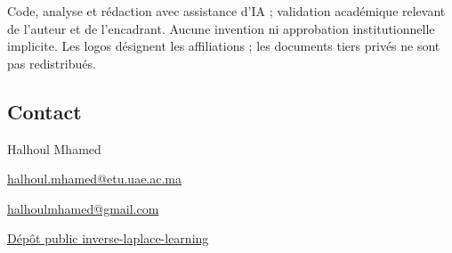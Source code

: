 \documentclass[11pt,a4paper]{article}
\begin{document}
Code, analyse et rédaction avec assistance d'IA ; validation académique relevant de l'auteur et de l'encadrant. Aucune invention ni approbation institutionnelle implicite. Les logos désignent les affiliations ; les documents tiers privés ne sont pas redistribués.

\subsection*{Contact}
Halhoul Mhamed\par
\href{mailto:halhoul.mhamed@etu.uae.ac.ma}{halhoul.mhamed@etu.uae.ac.ma}\par
\href{mailto:halhoulmhamed@gmail.com}{halhoulmhamed@gmail.com}\par
\href{https://github.com/halhoulmhamed-droid/inverse-laplace-learning}{Dépôt public inverse-laplace-learning}
\end{document}
